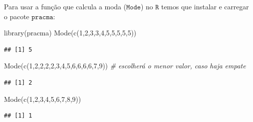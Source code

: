 \documentclass[
]{book}
\newenvironment{Shaded}{\begin{snugshade}}{\end{snugshade}}
\newcommand{\CommentTok}[1]{\textcolor[rgb]{0.56,0.35,0.01}{\textit{#1}}}
\newcommand{\DecValTok}[1]{\textcolor[rgb]{0.00,0.00,0.81}{#1}}
\newcommand{\FunctionTok}[1]{\textcolor[rgb]{0.00,0.00,0.00}{#1}}
\newcommand{\NormalTok}[1]{#1}
\begin{document}
Para usar a função que calcula a moda (\(\texttt{Mode}\)) no \(\texttt{R}\) temos que instalar e carregar o pacote \(\texttt{pracma}\):

\begin{Shaded}
\begin{Highlighting}[]
\FunctionTok{library}\NormalTok{(pracma)}
\FunctionTok{Mode}\NormalTok{(}\FunctionTok{c}\NormalTok{(}\DecValTok{1}\NormalTok{,}\DecValTok{2}\NormalTok{,}\DecValTok{3}\NormalTok{,}\DecValTok{3}\NormalTok{,}\DecValTok{4}\NormalTok{,}\DecValTok{5}\NormalTok{,}\DecValTok{5}\NormalTok{,}\DecValTok{5}\NormalTok{,}\DecValTok{5}\NormalTok{,}\DecValTok{5}\NormalTok{))}
\end{Highlighting}
\end{Shaded}

\begin{verbatim}
## [1] 5
\end{verbatim}

\begin{Shaded}
\begin{Highlighting}[]
\FunctionTok{Mode}\NormalTok{(}\FunctionTok{c}\NormalTok{(}\DecValTok{1}\NormalTok{,}\DecValTok{2}\NormalTok{,}\DecValTok{2}\NormalTok{,}\DecValTok{2}\NormalTok{,}\DecValTok{2}\NormalTok{,}\DecValTok{3}\NormalTok{,}\DecValTok{4}\NormalTok{,}\DecValTok{5}\NormalTok{,}\DecValTok{6}\NormalTok{,}\DecValTok{6}\NormalTok{,}\DecValTok{6}\NormalTok{,}\DecValTok{6}\NormalTok{,}\DecValTok{7}\NormalTok{,}\DecValTok{9}\NormalTok{)) }\CommentTok{\# escolherá o menor valor, caso haja empate}
\end{Highlighting}
\end{Shaded}

\begin{verbatim}
## [1] 2
\end{verbatim}

\begin{Shaded}
\begin{Highlighting}[]
\FunctionTok{Mode}\NormalTok{(}\FunctionTok{c}\NormalTok{(}\DecValTok{1}\NormalTok{,}\DecValTok{2}\NormalTok{,}\DecValTok{3}\NormalTok{,}\DecValTok{4}\NormalTok{,}\DecValTok{5}\NormalTok{,}\DecValTok{6}\NormalTok{,}\DecValTok{7}\NormalTok{,}\DecValTok{8}\NormalTok{,}\DecValTok{9}\NormalTok{))}
\end{Highlighting}
\end{Shaded}

\begin{verbatim}
## [1] 1
\end{verbatim}
\end{document}
